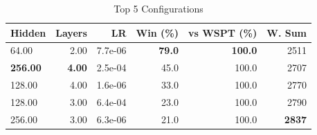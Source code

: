 \begin{table}[htbp]%
\centering%
\begin{tabular}{lrrrrr}%
\toprule%
\textbf{Hidden}&\textbf{Layers}&\textbf{LR}&\textbf{Win (\%)}&\textbf{vs WSPT (\%)}&\textbf{W. Sum}\\%
\midrule%
64.00&2.00&7.7e-06&\textbf{79.0}&\textbf{100.0}&2511\\%
\textbf{256.00}&\textbf{4.00}&2.5e-04&45.0&100.0&2707\\%
128.00&4.00&1.6e-06&33.0&100.0&2770\\%
128.00&3.00&6.4e-04&23.0&100.0&2790\\%
256.00&3.00&6.3e-06&21.0&100.0&\textbf{2837}\\%
\bottomrule%
\end{tabular}%
\caption{Top 5 Configurations}%
\label{tab:summary}%
\end{table}